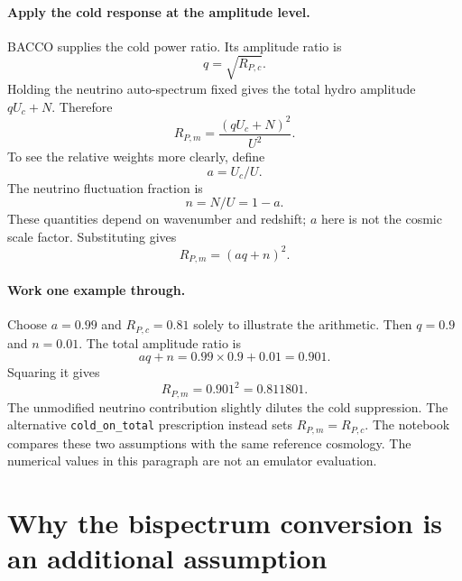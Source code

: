 \documentclass[11pt]{article}
\newcommand{\us}{\_\allowbreak}
\begin{document}
\paragraph{Apply the cold response at the amplitude level.}
BACCO supplies the cold power ratio. Its amplitude ratio is
\begin{equation}
 q=\sqrt{R_{P,c}}.
\end{equation}
Holding the neutrino auto-spectrum fixed gives the total hydro amplitude
$qU_c+N$. Therefore
\begin{equation}
 R_{P,m}=\frac{(qU_c+N)^2}{U^2}.
\end{equation}
To see the relative weights more clearly, define
\begin{equation}
 a=U_c/U.
\end{equation}
The neutrino fluctuation fraction is
\begin{equation}
 n=N/U=1-a.
\end{equation}
These quantities depend on wavenumber and redshift; $a$ here is not the
cosmic scale factor. Substituting gives
\begin{equation}
 R_{P,m}=(aq+n)^2.
\end{equation}

\paragraph{Work one example through.}
Choose $a=0.99$ and $R_{P,c}=0.81$ solely to illustrate the arithmetic.
Then $q=0.9$ and $n=0.01$. The total amplitude ratio is
\begin{equation}
 aq+n=0.99\times0.9+0.01=0.901.
\end{equation}
Squaring it gives
\begin{equation}
 R_{P,m}=0.901^2=0.811801.
\end{equation}
The unmodified neutrino contribution slightly dilutes the cold suppression.
The alternative \texttt{cold\us on\us total} prescription instead sets
$R_{P,m}=R_{P,c}$. The notebook compares these two assumptions with the same
reference cosmology. The numerical values in this paragraph are not an
emulator evaluation.

\section{Why the bispectrum conversion is an additional assumption}
\end{document}
